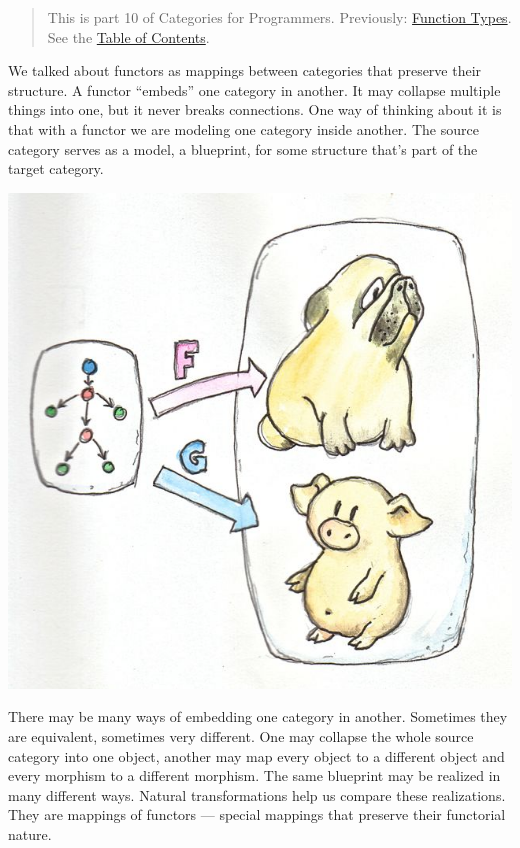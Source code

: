 \begin{quote}
This is part 10 of Categories for Programmers. Previously:
\href{https://bartoszmilewski.com/2015/03/13/function-types/}{Function
Types}. See the
\href{https://bartoszmilewski.com/2014/10/28/category-theory-for-programmers-the-preface/}{Table
of Contents}.
\end{quote}

We talked about functors as mappings between categories that preserve
their structure. A functor ``embeds'' one category in another. It may
collapse multiple things into one, but it never breaks connections. One
way of thinking about it is that with a functor we are modeling one
category inside another. The source category serves as a model, a
blueprint, for some structure that's part of the target category.

\includegraphics[width=5.31250in]{images/1_functors.jpg}

There may be many ways of embedding one category in another. Sometimes
they are equivalent, sometimes very different. One may collapse the
whole source category into one object, another may map every object to a
different object and every morphism to a different morphism. The same
blueprint may be realized in many different ways. Natural
transformations help us compare these realizations. They are mappings of
functors --- special mappings that preserve their functorial nature.

